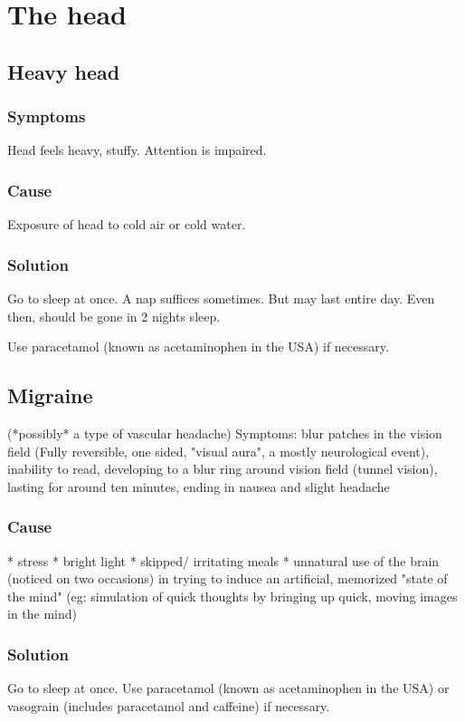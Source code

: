 \documentclass[oneside, article]{memoir}
\begin{document}
\chapter{The head}
\section{Heavy head}
\subsection{Symptoms}
Head feels heavy, stuffy. Attention is impaired.

\subsection{Cause}
Exposure of head to cold air or cold water.

\subsection{Solution}
Go to sleep at once. A nap suffices sometimes. But may last entire day. Even then, should be gone in 2 nights sleep.

Use paracetamol (known as acetaminophen in the USA) if necessary.

\section{Migraine}
(*possibly* a type of vascular headache)
Symptoms:
blur patches in the vision field (Fully reversible, one sided, "visual aura", a mostly neurological event), inability to read,
developing to a blur ring around vision field (tunnel vision),
lasting for around ten minutes, ending in nausea and slight headache

\subsection{Cause}

    * stress
    * bright light
    * skipped/ irritating meals
    * unnatural use of the brain (noticed on two occasions) in trying to induce an artificial, memorized "state of the mind" (eg: simulation of quick thoughts by bringing up quick, moving images in the mind)

\subsection{Solution}
Go to sleep at once.
Use paracetamol (known as acetaminophen in the USA) or vasograin (includes paracetamol and caffeine) if necessary.
\end{document}
